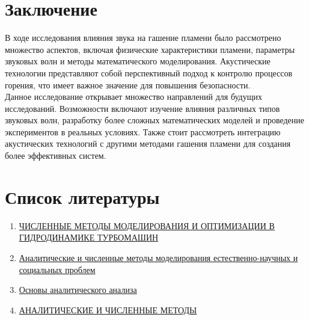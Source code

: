 \documentclass[a4paper,12pt]{article}
\begin{document}
\section{Заключение}
В ходе исследования влияния звука на гашение пламени было рассмотрено множество аспектов, включая физические характеристики пламени, параметры звуковых волн и методы математического моделирования. Акустические технологии представляют собой перспективный подход к контролю процессов горения, что имеет важное значение для повышения безопасности.\\
Данное исследование открывает множество направлений для будущих исследований. Возможности включают изучение влияния различных типов звуковых волн, разработку более сложных математических моделей и проведение экспериментов в реальных условиях. Также стоит рассмотреть интеграцию акустических технологий с другими методами гашения пламени для создания более эффективных систем.
\newpage
\section*{Список литературы}
\begin{enumerate}
    \item \href{http://www.ict.nsc.ru/sites/default/files/discouncil/Enlist/Oold_Ref/cherny.pdf}{ЧИСЛЕННЫЕ МЕТОДЫ МОДЕЛИРОВАНИЯ И ОПТИМИЗАЦИИ В ГИДРОДИНАМИКЕ ТУРБОМАШИН}\\
    \item \href{https://dep_vipm.pnzgu.ru/files/dep_vipm.pnzgu.ru/konference/achmm2016.pdf}{Аналитические и численные методы моделирования естественно-научных и социальных проблем}\\
    \item \href{https://staff.tiiame.uz/storage/users/4/books/Ghrf3Zz0xenlYSpVTogElcVOyHxu97JG4NOr1Qwu.pdf}{Основы аналитического анализа}\\
    \item \href{https://kpfu.ru/staff_files/F1845062855/Analiticheskie.i.chislennye.metody.pdf}{АНАЛИТИЧЕСКИЕ И ЧИСЛЕННЫЕ МЕТОДЫ}\\
\end{enumerate}


\end{document}
